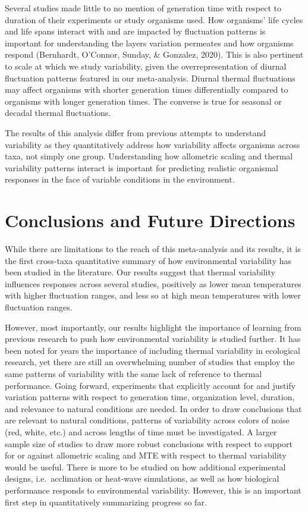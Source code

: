 \documentclass[12pt,twoside]{reedthesis}
\begin{document}
Several studies made little to no mention of generation time with respect to duration of their experiments or study organisms used. How organisms' life cycles and life spans interact with and are impacted by fluctuation patterns is important for understanding the layers variation permeates and how organisms respond (Bernhardt, O'Connor, Sunday, \& Gonzalez, 2020). This is also pertinent to scale at which we study variability, given the overrepresentation of diurnal fluctuation patterns featured in our meta-analysis. Diurnal thermal fluctuations may affect organisms with shorter generation times differentially compared to organisms with longer generation times. The converse is true for seasonal or decadal thermal fluctuations.

The results of this analysis differ from previous attempts to understand variability as they quantitatively address how variability affects organisms across taxa, not simply one group. Understanding how allometric scaling and thermal variability patterns interact is important for predicting realistic organismal responses in the face of variable conditions in the environment.

\hypertarget{conclusions-and-future-directions}{%
\chapter*{Conclusions and Future Directions}\label{conclusions-and-future-directions}}

While there are limitations to the reach of this meta-analysis and its results, it is the first cross-taxa quantitative summary of how environmental variability has been studied in the literature. Our results suggest that thermal variability influences responses across several studies, positively as lower mean temperatures with higher fluctuation ranges, and less so at high mean temperatures with lower fluctuation ranges.

However, most importantly, our results highlight the importance of learning from previous research to push how environmental variability is studied further. It has been noted for years the importance of including thermal variability in ecological research, yet there are still an overwhelming number of studies that employ the same patterns of variability with the same lack of reference to thermal performance. Going forward, experiments that explicitly account for and justify variation patterns with respect to generation time, organization level, duration, and relevance to natural conditions are needed. In order to draw conclusions that are relevant to natural conditions, patterns of variability across colors of noise (red, white, etc.) and across lengths of time must be investigated. A larger sample size of studies to draw more robust conclusions with respect to support for or against allometric scaling and MTE with respect to thermal variability would be useful. There is more to be studied on how additional experimental designs, i.e.~acclimation or heat-wave simulations, as well as how biological performance responds to environmental variability. However, this is an important first step in quantitatively summarizing progress so far.
\end{document}
